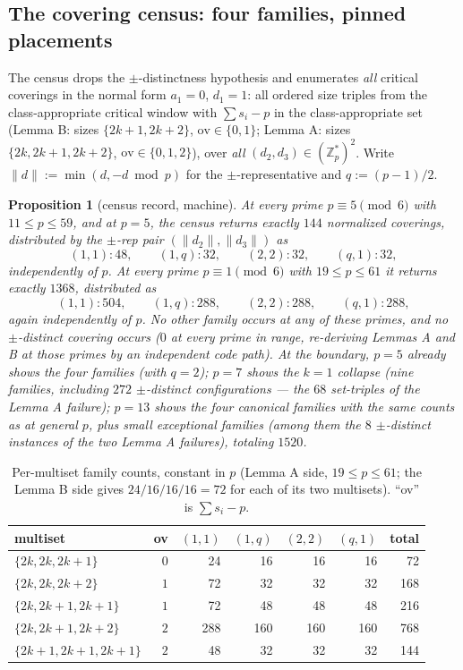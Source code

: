 \documentclass[11pt,a4paper]{article}
\numberwithin{equation}{section}
\theoremstyle{plain}
\newtheorem{proposition}[theorem]{Proposition}
\theoremstyle{definition}
\theoremstyle{remark}
\newcommand{\Z}{\mathbb{Z}}
\begin{document}
\subsection{The covering census: four families, pinned placements}
\label{sec:gt-census}

The census drops the $\pm$-distinctness hypothesis and enumerates
\emph{all} critical coverings in the normal form $a_1=0$, $d_1=1$: all
ordered size triples from the class-appropriate critical window with
$\sum s_i-p$ in the class-appropriate set (Lemma B: sizes
$\{2k{+}1,2k{+}2\}$, $\mathrm{ov}\in\{0,1\}$; Lemma A: sizes
$\{2k,2k{+}1,2k{+}2\}$, $\mathrm{ov}\in\{0,1,2\}$), over \emph{all}
$(d_2,d_3)\in(\Z_p^{*})^2$. Write $\|d\|:=\min(d,-d \bmod p)$ for the
$\pm$-representative and $q:=(p-1)/2$.

\begin{proposition}[census record, machine]\label{prop:census}
At every prime $p\equiv5\pmod 6$ with $11\le p\le 59$, and at $p=5$, the
census returns exactly $144$ normalized coverings, distributed by the
$\pm$-rep pair $(\|d_2\|,\|d_3\|)$ as
\[
(1,1):48,\qquad (1,q):32,\qquad (2,2):32,\qquad (q,1):32,
\]
independently of $p$. At every prime $p\equiv1\pmod 6$ with $19\le p\le 61$
it returns exactly $1368$, distributed as
\[
(1,1):504,\qquad (1,q):288,\qquad (2,2):288,\qquad (q,1):288,
\]
again independently of $p$. No other family occurs at any of these primes,
and no $\pm$-distinct covering occurs ($0$ at every prime in range,
re-deriving Lemmas A and B at those primes by an independent code path).
At the boundary, $p=5$ already shows the four families (with $q=2$); $p=7$
shows the $k=1$ collapse (nine families, including $272$ $\pm$-distinct
configurations --- the $68$ set-triples of the Lemma A failure); $p=13$
shows the four canonical families with the same counts as at general $p$,
plus small exceptional families (among them the $8$ $\pm$-distinct
instances of the two Lemma A failures), totaling $1520$.
\end{proposition}

\begin{table}[t]
\centering
\small
\caption{Per-multiset family counts, constant in $p$ (Lemma A side, $19\le
p\le 61$; the Lemma B side gives $24/16/16/16=72$ for each of its two
multisets). ``ov'' is $\sum s_i-p$.}
\label{tab:permultiset}
\begin{tabular}{@{}lrrrrrr@{}}
\toprule
multiset & ov & $(1,1)$ & $(1,q)$ & $(2,2)$ & $(q,1)$ & total \\
\midrule
$\{2k,2k,2k{+}1\}$ & $0$ & 24 & 16 & 16 & 16 & 72 \\
$\{2k,2k,2k{+}2\}$ & $1$ & 72 & 32 & 32 & 32 & 168 \\
$\{2k,2k{+}1,2k{+}1\}$ & $1$ & 72 & 48 & 48 & 48 & 216 \\
$\{2k,2k{+}1,2k{+}2\}$ & $2$ & 288 & 160 & 160 & 160 & 768 \\
$\{2k{+}1,2k{+}1,2k{+}1\}$ & $2$ & 48 & 32 & 32 & 32 & 144 \\
\bottomrule
\end{tabular}
\end{table}
\end{document}
